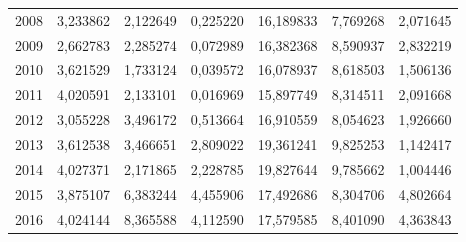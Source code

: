\begin{table}
\begin{tabular}{p{1cm}p{2cm}p{2cm}p{2cm}p{2cm}p{2cm}p{2cm}}
 2008 &                             3,233862 &      2,122649 &                                           0,225220 &                  16,189833 &                        7,769268 &                                           2,071645 \\
 2009 &                             2,662783 &      2,285274 &                                           0,072989 &                  16,382368 &                        8,590937 &                                           2,832219 \\
 2010 &                             3,621529 &      1,733124 &                                           0,039572 &                  16,078937 &                        8,618503 &                                           1,506136 \\
 2011 &                             4,020591 &      2,133101 &                                           0,016969 &                  15,897749 &                        8,314511 &                                           2,091668 \\
 2012 &                             3,055228 &      3,496172 &                                           0,513664 &                  16,910559 &                        8,054623 &                                           1,926660 \\
 2013 &                             3,612538 &      3,466651 &                                           2,809022 &                  19,361241 &                        9,825253 &                                           1,142417 \\
 2014 &                             4,027371 &      2,171865 &                                           2,228785 &                  19,827644 &                        9,785662 &                                           1,004446 \\
 2015 &                             3,875107 &      6,383244 &                                           4,455906 &                  17,492686 &                        8,304706 &                                           4,802664 \\
 2016 &                             4,024144 &      8,365588 &                                           4,112590 &                  17,579585 &                        8,401090 &                                           4,363843 \\
\bottomrule
\end{tabular}
\end{table}
